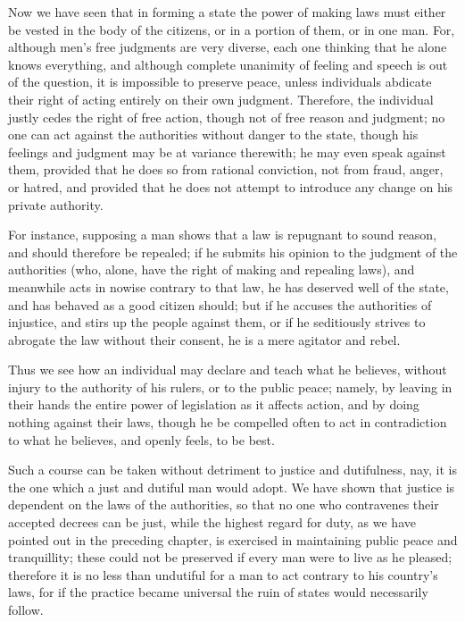 Now we have seen that in forming a state the power of making laws must
either be vested in the body of the citizens, or in a portion of them,
or in one man. For, although men's free judgments are very diverse,
each one thinking that he alone knows everything, and although
complete unanimity of feeling and speech is out of the question, it is
impossible to preserve peace, unless individuals abdicate their right
of acting entirely on their own judgment. Therefore, the individual
justly cedes the right of free action, though not of free reason and
judgment; no one can act against the authorities without danger to the
state, though his feelings and judgment may be at variance therewith;
he may even speak against them, provided that he does so from rational
conviction, not from fraud, anger, or hatred, and provided that he
does not attempt to introduce any change on his private authority.

For instance, supposing a man shows that a law is repugnant to sound
reason, and should therefore be repealed; if he submits his opinion to
the judgment of the authorities (who, alone, have the right of making
and repealing laws), and meanwhile acts in nowise contrary to that
law, he has deserved well of the state, and has behaved as a good
citizen should; but if he accuses the authorities of injustice, and
stirs up the people against them, or if he seditiously strives to
abrogate the law without their consent, he is a mere agitator and
rebel.

Thus we see how an individual may declare and teach what he believes,
without injury to the authority of his rulers, or to the public peace;
namely, by leaving in their hands the entire power of legislation as
it affects action,  and by doing nothing against their laws,
though he be compelled often to act in contradiction to what he
believes, and openly feels, to be best.

Such a course can be taken without detriment to justice and
dutifulness, nay, it is the one which a just and dutiful man would
adopt. We have shown that justice is dependent on the laws of the
authorities, so that no one who contravenes their accepted decrees can
be just, while the highest regard for duty, as we have pointed out in
the preceding chapter, is exercised in maintaining public peace and
tranquillity; these could not be preserved if every man were to live
as he pleased; therefore it is no less than undutiful for a man to act
contrary to his country's laws, for if the practice became universal
the ruin of states would necessarily follow.

